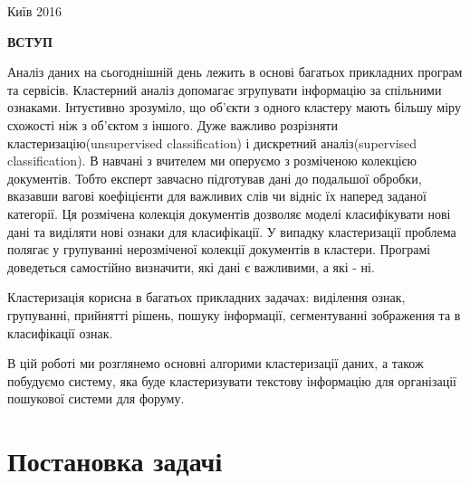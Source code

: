 \documentclass[a4paper,14pt,russian]{extreport}
\newcommand{\empline}{\mbox{}\newline}
\newcommand{\likechapterheading}[1]{
\begin{center}
     \textbf{\MakeUppercase{#1}}
     \end{center}
         \empline}
\newcommand{\likechapter}[1]{
\likechapterheading{#1}
\addcontentsline{toc}{likechapter}{\MakeUppercase{#1}}}
\begin{document}
		 \vfill
		\begin{center}
		Київ 2016
	\end{center}
 



\newpage
\tableofcontents
\newpage

\likechapter{Вступ}
\par 
Аналіз даних на сьогоднішній день лежить в основі багатьох прикладних програм та сервісів. Кластерний аналіз допомагає згрупувати інформацію за спільними ознаками. Інтуєтивно зрозуміло, що об'єкти з одного кластеру мають більшу міру схожості ніж з об'єктом з іншого. Дуже важливо розрізняти кластеризацію(unsupervised classification) і дискретний аналіз(supervised classification). В навчані з вчителем ми оперуємо з розміченою колекцією документів. Тобто експерт завчасно підготував дані до подальшої обробки, вказавши вагові коефіцієнти для важливих слів чи відніс їх наперед заданої категорії. Ця розмічена колекція документів дозволяє моделі класифікувати нові дані та виділяти нові ознаки для класифікації. У випадку кластеризації проблема полягає у групуванні нерозміченої колекції документів в  кластери. Програмі доведеться самостійно визначити, які дані є важливими, а які  - ні. \par 
Кластеризація корисна в багатьох прикладних задачах: виділення ознак, групуванні, прийнятті рішень, пошуку інформації, сегментуванні зображення та в класифікації ознак.\cite{jain} \par 
В цій роботі ми розглянемо основні алгорими кластеризації даних, а також побудуємо систему, яка буде 
кластеризувати текстову інформацію для організації пошукової системи для форуму.

\chapter{Постановка задачі}
\end{document}
